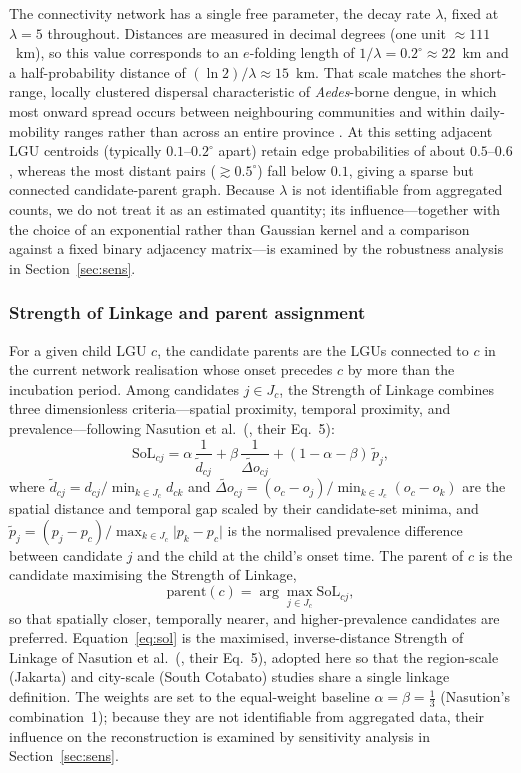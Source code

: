 \documentclass[a4paper,11pt]{article}
\begin{document}
The connectivity network has a single free parameter, the decay rate $\lambda$,
fixed at $\lambda=5$ throughout. Distances are measured in decimal degrees (one unit
$\approx 111$~km), so this value corresponds to an $e$-folding length of
$1/\lambda = 0.2^{\circ}\approx 22$~km and a half-probability distance of
$(\ln 2)/\lambda \approx 15$~km. That scale matches the short-range, locally
clustered dispersal characteristic of \emph{Aedes}-borne dengue, in which most
onward spread occurs between neighbouring communities and within daily-mobility
ranges rather than across an entire province \cite{Stoddard2009,Wesolowski2015}. At
this setting adjacent LGU centroids (typically $0.1$--$0.2^{\circ}$ apart) retain
edge probabilities of about $0.5$--$0.6$, whereas the most distant pairs
($\gtrsim 0.5^{\circ}$) fall below $0.1$, giving a sparse but connected
candidate-parent graph. Because $\lambda$ is not identifiable from aggregated
counts, we do not treat it as an estimated quantity; its influence---together with
the choice of an exponential rather than Gaussian kernel and a comparison against a
fixed binary adjacency matrix---is examined by the robustness analysis in
Section~\ref{sec:sens}.

\subsubsection{Strength of Linkage and parent assignment}
For a given child LGU $c$, the candidate parents are the LGUs connected to $c$ in
the current network realisation whose onset precedes $c$ by more than the
incubation period. Among candidates $j \in J_c$, the Strength of Linkage combines
three dimensionless criteria---spatial proximity, temporal proximity, and
prevalence---following Nasution et al.\ (\cite{Nasution2024}, their Eq.~5):
\begin{equation}
\mathrm{SoL}_{cj} =
\alpha\, \frac{1}{\tilde d_{cj}} +
\beta\, \frac{1}{\widetilde{\Delta o}_{cj}} +
(1-\alpha-\beta)\,\tilde p_{j} ,
\label{eq:sol}
\end{equation}
where $\tilde d_{cj} = d_{cj}/\min_{k\in J_c} d_{ck}$ and
$\widetilde{\Delta o}_{cj} = (o_c-o_j)/\min_{k\in J_c}(o_c-o_k)$ are the spatial
distance and temporal gap scaled by their candidate-set minima, and
$\tilde p_{j} = (p_j-p_c)/\max_{k\in J_c}\lvert p_k-p_c\rvert$ is the normalised
prevalence difference between candidate $j$ and the child at the child's onset
time. The parent of $c$ is the candidate maximising the Strength of Linkage,
\begin{equation}
\mathrm{parent}(c) = \arg\max_{j \in J_c} \mathrm{SoL}_{cj},
\label{eq:parent}
\end{equation}
so that spatially closer, temporally nearer, and higher-prevalence candidates are
preferred. Equation~\ref{eq:sol} is the maximised, inverse-distance Strength of
Linkage of Nasution et al.\ (\cite{Nasution2024}, their Eq.~5), adopted here so
that the region-scale (Jakarta) and city-scale (South Cotabato) studies share a
single linkage definition. The weights are set to the equal-weight baseline
$\alpha=\beta=\tfrac13$ (Nasution's combination~1); because they are not
identifiable from aggregated data, their influence on the reconstruction is
examined by sensitivity analysis in Section~\ref{sec:sens}.
\end{document}
